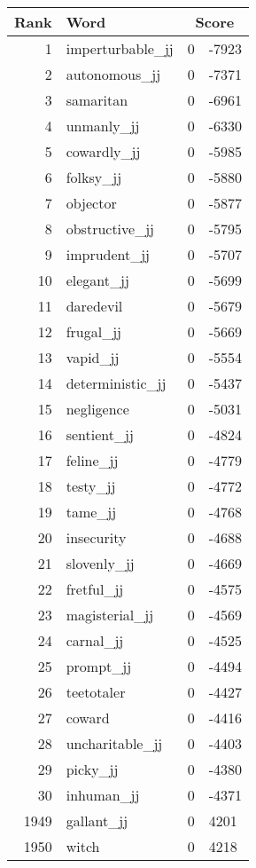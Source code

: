 \begin{longtable}[!htbp]{| rlr@{.}l |}
    \hline
    \textbf{Rank} & \textbf{Word} & \multicolumn{2}{c|}{\textbf{Score}} \\
    \hline
    \endhead
    1 & imperturbable\_jj & 0 & -7923 \\
    2 & autonomous\_jj & 0 & -7371 \\
    3 & samaritan & 0 & -6961 \\
    4 & unmanly\_jj & 0 & -6330 \\
    5 & cowardly\_jj & 0 & -5985 \\
    6 & folksy\_jj & 0 & -5880 \\
    7 & objector & 0 & -5877 \\
    8 & obstructive\_jj & 0 & -5795 \\
    9 & imprudent\_jj & 0 & -5707 \\
    10 & elegant\_jj & 0 & -5699 \\
    11 & daredevil & 0 & -5679 \\
    12 & frugal\_jj & 0 & -5669 \\
    13 & vapid\_jj & 0 & -5554 \\
    14 & deterministic\_jj & 0 & -5437 \\
    15 & negligence & 0 & -5031 \\
    16 & sentient\_jj & 0 & -4824 \\
    17 & feline\_jj & 0 & -4779 \\
    18 & testy\_jj & 0 & -4772 \\
    19 & tame\_jj & 0 & -4768 \\
    20 & insecurity & 0 & -4688 \\
    21 & slovenly\_jj & 0 & -4669 \\
    22 & fretful\_jj & 0 & -4575 \\
    23 & magisterial\_jj & 0 & -4569 \\
    24 & carnal\_jj & 0 & -4525 \\
    25 & prompt\_jj & 0 & -4494 \\
    26 & teetotaler & 0 & -4427 \\
    27 & coward & 0 & -4416 \\
    28 & uncharitable\_jj & 0 & -4403 \\
    29 & picky\_jj & 0 & -4380 \\
    30 & inhuman\_jj & 0 & -4371 \\
    1949 & gallant\_jj & 0 & 4201 \\
    1950 & witch & 0 & 4218 \\

\end{longtable}
